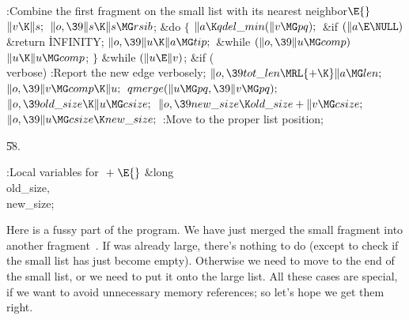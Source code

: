 \B{}:Combine the first fragment on the small list with its nearest
neighbor\X${}\E{}$\6
$\|v\K\|s;{}$\6
${}\|o,\39\|s\K\|s\MG\\{rsib}{}$;\6
\&{do}\5
${}\{{}$\1\6
${}\|a\K\\{qdel\_min}(\|v\MG\\{pq});{}$\6
\&{if} ${}(\|a\E\NULL){}$\1\5
\&{return} \.{INFINITY};\2\6
${}\|o,\39\|u\K\|a\MG\\{tip};{}$\6
\&{while} ${}(\|o,\39\|u\MG\\{comp}){}$\1\5
${}\|u\K\|u\MG\\{comp}{}$;\2\6
\4${}\}{}$\5
\2\5
\&{while} ${}(\|u\E\|v){}$;\6
\&{if} (\\{verbose})\1\5
:Report the new edge verbosely\X;\2\6
${}\|o,\39\\{tot\_len}\MRL{+{\K}}\|a\MG\\{len};{}$\6
${}\|o,\39\|v\MG\\{comp}\K\|u;{}$\6
${}\\{qmerge}(\|u\MG\\{pq},\39\|v\MG\\{pq});{}$\6
${}\|o,\39\\{old\_size}\K\|u\MG\\{csize};{}$\6
${}\|o,\39\\{new\_size}\K\\{old\_size}+\|v\MG\\{csize};{}$\6
${}\|o,\39\|u\MG\\{csize}\K\\{new\_size};{}$\6
:Move  to the proper list position\X;\par
\U58.\fi

\B{}:Local variables for \X${}\mathrel+\E{}$\6
\&{long} \\{old\_size}${},{}$ \\{new\_size};\par
\fi

Here is a fussy part of the program. We have just merged the small
fragment  into another fragment~. If  was already
large,
there's nothing to do (except to check if the small list has just
become empty). Otherwise we need to move  to the end of the small
list, or we need to put it onto the large list.
All these cases are special, if we
want to avoid unnecessary memory references; so let's hope we get them right.


